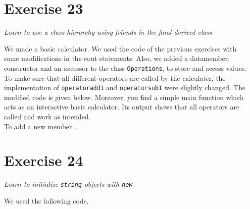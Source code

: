 \documentclass[12pt]{article}
\newcommand{\desc}[1]{\textit{#1} \vspace{1em}}
\begin{document}


\clearpage

\section*{Exercise 23}
\desc{Learn to use a class hierarchy using friends in the final derived class}

We made a basic calculator. We used the code of the previous exercises with some modifications in the cout statements. Also, we added a datamember, constructor and an accessor to the class \texttt{Operations}, to store and access values. To make sure that all different operators are called by the calculater, the implementation of \texttt{operatoradd1} and \texttt{operatorsub1} were slightly changed. The modified code is given below. Moreover, you find a simple main function which acts as an interactive basic calculator. Its output shows that all operators are called and work as intended.\\

To add a new member...














\clearpage

\section*{Exercise 24}
\desc{Learn to initialize \texttt{string} objects with \texttt{new}}

We used the following code,







\clearpage
\end{document}
